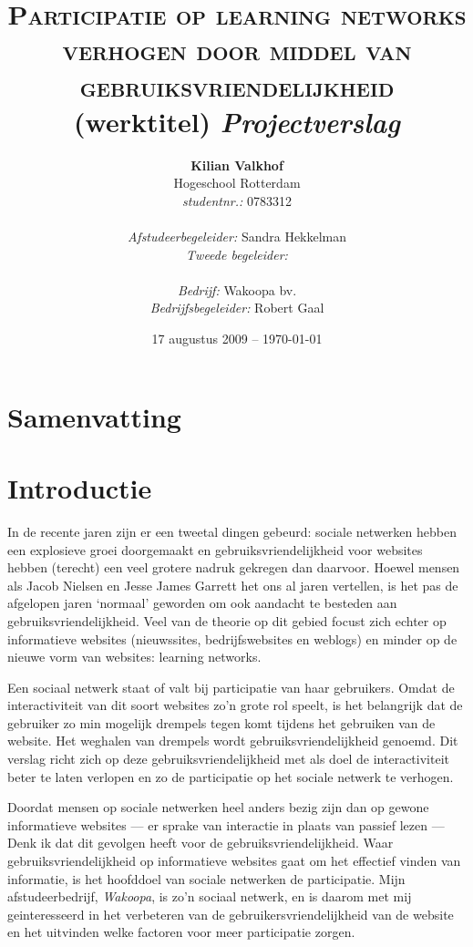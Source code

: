\documentclass[a4paper, 10pt, pdftex]{report}
\title{\textsc{Participatie op learning networks verhogen door middel van gebruiksvriendelijkheid} \linebreak (werktitel) \linebreak \emph{Projectverslag}}
\author{\textbf{Kilian Valkhof}\\
  Hogeschool Rotterdam\\
  \textit{studentnr.:} 0783312\\
  \\
  \textit{Afstudeerbegeleider:} Sandra Hekkelman\\
  \textit{Tweede begeleider:}\\
  \\
  \textit{Bedrijf:} Wakoopa bv.\\
  \textit{Bedrijfsbegeleider:} Robert Gaal}
\date{17 augustus 2009 -- \today}
\begin{document}
  \normalem
  \maketitle

  \newpage
  \chapter*{Samenvatting}

  \newpage
  \tableofcontents

  \newpage
  \chapter*{Introductie}
    In de recente jaren zijn er een tweetal dingen gebeurd: sociale netwerken hebben een explosieve groei doorgemaakt
  en gebruiksvriendelijkheid voor websites hebben (terecht) een veel grotere nadruk gekregen dan daarvoor. Hoewel mensen
  als Jacob Nielsen en Jesse James Garrett het ons al jaren vertellen, is het pas de afgelopen jaren `normaal' geworden
  om ook aandacht te besteden aan gebruiksvriendelijkheid. Veel van de theorie op dit gebied focust zich echter op
  informatieve websites (nieuwssites, bedrijfswebsites en weblogs) en minder op de nieuwe vorm van websites: learning networks.

    Een sociaal netwerk staat of valt bij participatie van haar gebruikers. Omdat de interactiviteit van dit soort websites zo'n grote rol speelt, is het belangrijk dat de gebruiker zo min mogelijk drempels tegen komt tijdens het gebruiken van de website. Het weghalen van drempels wordt gebruiksvriendelijkheid genoemd. Dit verslag richt zich op deze gebruiksvriendelijkheid met als doel de interactiviteit beter te laten verlopen en zo de participatie op het sociale netwerk te verhogen.

  Doordat mensen op sociale netwerken heel anders bezig zijn dan op gewone informatieve websites --- er sprake van interactie in plaats van passief lezen --- Denk ik dat dit gevolgen heeft voor de gebruiksvriendelijkheid. Waar gebruiksvriendelijkheid op informatieve websites gaat om het effectief vinden van informatie, is het hoofddoel van sociale netwerken de participatie. Mijn afstudeerbedrijf, \emph{Wakoopa}, is zo'n sociaal netwerk, en is daarom met mij geinteresseerd in het verbeteren van de gebruikersvriendelijkheid van de website en het uitvinden welke factoren voor meer participatie zorgen.
\end{document}
